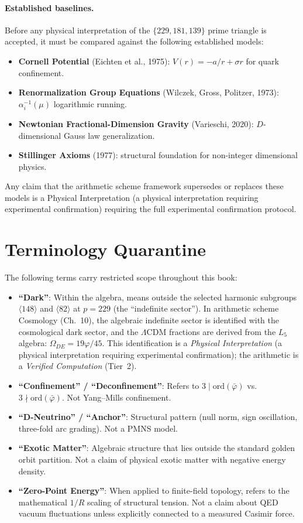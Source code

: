 \documentclass[12pt,oneside]{book}
\theoremstyle{principia}
\theoremstyle{definition}
\theoremstyle{remark}
\providecommand{\vpbar}{\bar{\varphi}}
\begin{document}
\paragraph{Established baselines.} Before any physical interpretation of the $\{229, 181, 139\}$ prime triangle is accepted, it must be compared against the following established models:
\begin{itemize}[noitemsep]
\item \textbf{Cornell Potential} (Eichten et al., 1975): $V(r) = -a/r + \sigma r$ for quark confinement.
\item \textbf{Renormalization Group Equations} (Wilczek, Gross, Politzer, 1973): $\alpha_i^{-1}(\mu)$ logarithmic running.
\item \textbf{Newtonian Fractional-Dimension Gravity} (Varieschi, 2020): $D$-dimensional Gauss law generalization.
\item \textbf{Stillinger Axioms} (1977): structural foundation for non-integer dimensional physics.
\end{itemize}
Any claim that the arithmetic scheme framework supersedes or replaces these models is a Physical Interpretation (a physical interpretation requiring experimental confirmation) requiring the full experimental confirmation protocol.

\section{Terminology Quarantine}
The following terms carry restricted scope throughout this book:
\begin{itemize}[noitemsep]
\item \textbf{``Dark''}: Within the algebra, means outside the selected harmonic subgroups $\langle 148 \rangle$ and $\langle 82 \rangle$ at $p = 229$ (the ``indefinite sector''). In arithmetic scheme Cosmology (Ch.~10), the algebraic indefinite sector is identified with the cosmological dark sector, and the $\Lambda$CDM fractions are derived from the $L_5$ algebra: $\Omega_{DE} = 19\varphi/45$. This identification is a \emph{Physical Interpretation} (a physical interpretation requiring experimental confirmation); the arithmetic is a \emph{Verified Computation} (Tier~2).
\item \textbf{``Confinement'' / ``Deconfinement''}: Refers to $3 \mid \mathrm{ord}(\vpbar)$ vs.\ $3 \nmid \mathrm{ord}(\vpbar)$. Not Yang--Mills confinement.
\item \textbf{``D-Neutrino'' / ``Anchor''}: Structural pattern (null norm, sign oscillation, three-fold arc grading). Not a PMNS model.
\item \textbf{``Exotic Matter''}: Algebraic structure that lies outside the standard golden orbit partition. Not a claim of physical exotic matter with negative energy density.
\item \textbf{``Zero-Point Energy''}: When applied to finite-field topology, refers to the mathematical $1/R$ scaling of structural tension. Not a claim about QED vacuum fluctuations unless explicitly connected to a measured Casimir force.
\end{itemize}
\end{document}
